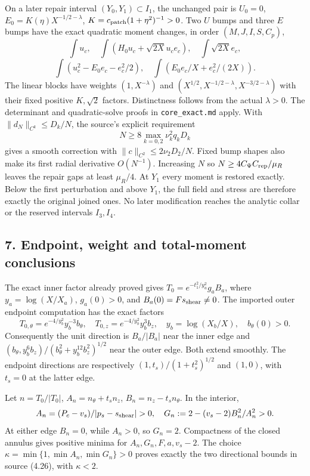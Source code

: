 \documentclass[10pt,a4paper]{article}
\begin{document}
On a later repair interval \((Y_0,Y_1)\subset I_1\), the unchanged pair is \(U_0=0\), \(E_0=K(\eta)X^{-1/2-\lambda}\), \(K=c_{\rm patch}(1+\eta^2)^{-1}>0\). Two \(U\) bumps and three \(E\) bumps have the exact quadratic moment changes, in order \((M,J,I,S,C_p)\),
\[
\int u_c,\quad\int(H_0u_c+\sqrt{2X}u_ce_c),\quad\int\sqrt{2X}e_c,
\]
\[
\int(u_c^2-E_0e_c-e_c^2/2),\quad\int(E_0e_c/X+e_c^2/(2X)).
\]
The linear blocks have weights \((1,X^{-\lambda})\) and \((X^{1/2},X^{-1/2-\lambda},X^{-3/2-\lambda})\) with their fixed positive \(K,\sqrt2\) factors. Distinctness follows from the actual \(\lambda>0\). The determinant and quadratic-solve proofs in \texttt{core\_exact.md} apply. With \(\|d_N\|_{C^k}\le D_k/N\), the source's explicit requirement
\[
N\ge8\max_{k=0,2}\nu_k^2q_kD_k
\]
gives a smooth correction with \(\|c\|_{C^2}\le2\nu_2D_2/N\). Fixed bump shapes also make its first radial derivative \(O(N^{-1})\). Increasing \(N\) so \(N\ge4C_\Psi C_{\rm rep}/\mu_R\) leaves the repair gaps at least \(\mu_R/4\). At \(Y_1\) every moment is restored exactly. Below the first perturbation and above \(Y_1\), the full field and stress are therefore exactly the original joined ones. No later modification reaches the analytic collar or the reserved intervals \(I_3,I_4\).

\subsection{7. Endpoint, weight and total-moment conclusions}

The exact inner factor already proved gives \(T_0=e^{-t_1^2/y_a^2}g_aB_a\), where \(y_a=\log(X/X_a)\), \(g_a(0)>0\), and \(B_a(0)=Fs_{\rm shear}\ne0\). The imported outer endpoint computation has the exact factors
\[
T_{0,\theta}=e^{-4/y_b^2}y_b^{-3}b_\theta,
\quad T_{0,z}=e^{-4/y_b^2}y_b^3b_z,
\quad y_b=\log(X_b/X),\quad b_\theta(0)>0.
\]
Consequently the unit direction is \(B_a/|B_a|\) near the inner edge and
\((b_\theta,y_b^6b_z)/(b_\theta^2+y_b^{12}b_z^2)^{1/2}\) near the outer edge. Both extend smoothly. The endpoint directions are respectively \((1,t_s)/(1+t_s^2)^{1/2}\) and \((1,0)\), with \(t_s=0\) at the latter edge.

Let \(n=T_0/|T_0|\), \(A_n=n_\theta+t_sn_z\), \(B_n=n_z-t_sn_\theta\). In the interior,
\[
A_n=(P_c-v_s)/|p_s-s_{\rm shear}|>0,
\quad G_n:=2-(v_s-2)B_n^2/A_n^2>0.
\]
At either edge \(B_n=0\), while \(A_n>0\), so \(G_n=2\). Compactness of the closed annulus gives positive minima for \(A_n,G_n,F,a,v_s-2\). The choice
\(\kappa=\min\{1,\min A_n,\min G_n\}>0\)
proves exactly the two directional bounds in source (4.26), with \(\kappa<2\).
\end{document}
